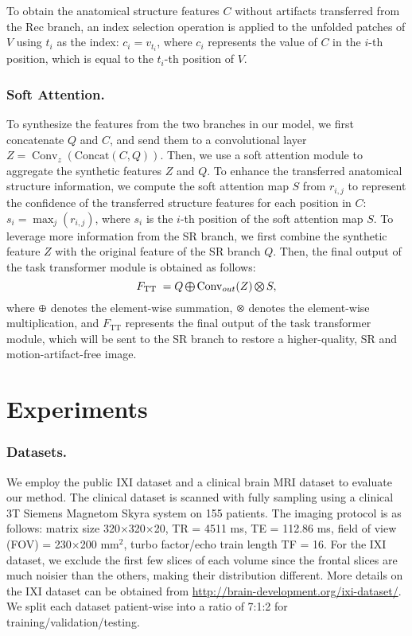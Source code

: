 \documentclass[runningheads]{llncs}
\DeclareMathOperator*{\Motimes}{\text{\raisebox{0.25ex}{\scalebox{0.6}{$\bigotimes$}}}}
\DeclareMathOperator*{\Moplus}{\text{\raisebox{0.25ex}{\scalebox{0.6}{$\bigoplus$}}}}
\begin{document}
To obtain the anatomical structure features $C$ without artifacts transferred from the Rec branch, an index selection operation is applied to the unfolded patches of $V$ using $t_i$ as the index: $c_{i}=v_{t_{i}}$, where $c_i$ represents the value of $C$ in the $i$-th position, which is equal to the $t_i$-th position of $V$.

\subsubsection{Soft Attention.}
To synthesize the features from the two branches in our model, we first concatenate $Q$ and $C$, and send them to a convolutional layer $Z=\operatorname{Conv}_{z}(\text {Concat}(C, Q))$. Then, we use a soft attention module to aggregate the synthetic features $Z$ and $Q$. To enhance the transferred anatomical structure information, we compute the soft attention map $S$ from $r_{i, j}$ to represent the confidence of the transferred structure features for each position in $C$: $s_{i}=\max_{j}(r_{i, j})$, where $s_{i}$ is the $i$-th position of the soft attention map $S$. To leverage more information from the SR branch, we first combine the synthetic feature $Z$ with the original feature of the SR branch $Q$. Then, the final output of the task transformer module is obtained as follows:
\begin{equation}
F_{\text {TT }}=Q \Moplus \operatorname{Conv}_{out}(Z) \Motimes S,
\end{equation}
where $\Moplus$ denotes the element-wise summation, $\Motimes$ denotes the element-wise multiplication, and $F_{\text {TT}}$ represents the final output of the task transformer module, which will be sent to the SR branch to restore a higher-quality, SR and motion-artifact-free image.







\section{Experiments}
\subsubsection{Datasets.}
We employ the public IXI dataset and a clinical brain MRI dataset to evaluate our method. The clinical dataset is scanned with fully sampling using a clinical 3T Siemens Magnetom Skyra system on 155 patients. The imaging protocol is as follows: matrix size 320$\times$320$\times$20, TR = 4511 ms, TE = 112.86 ms, field of view (FOV) = 230$\times$200 mm$^2$, turbo factor/echo train length TF = 16. For the IXI dataset, we exclude the first few slices of each volume since the frontal slices are much noisier than the others, making their distribution different. More details on the IXI dataset can be obtained from \url{http://brain-development.org/ixi-dataset/}. We split each dataset patient-wise into a ratio of 7:1:2 for training/validation/testing.
\end{document}
